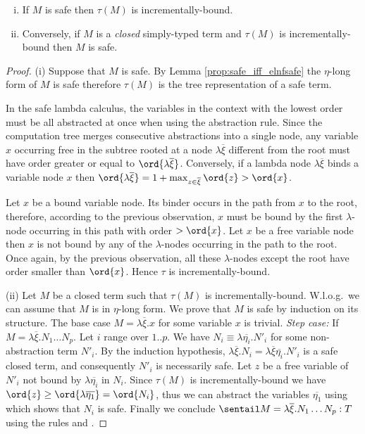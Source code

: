 \begin{proposition} \hfill
\label{prop:safe_imp_incrbound}
\begin{enumerate}[(i)]
\item If $M$ is safe then $\tau(M)$ is incrementally-bound.
\item Conversely, if $M$ is a \emph{closed} simply-typed term and $\tau(M)$
is incrementally-bound then $M$ is safe.
\end{enumerate}
\end{proposition}
\begin{proof}
  (i) Suppose that $M$ is safe. By Lemma
  \ref{prop:safe_iff_elnfsafe} the $\eta$-long form of $M$ is safe
  therefore $\tau(M)$ is the tree representation of a safe term.

In the safe lambda calculus, the variables in the context with the
lowest order must be all abstracted at once when using the
abstraction rule. Since the computation tree merges consecutive
abstractions into a single node, any variable $x$ occurring free in
the subtree rooted at a node $\lambda \overline{\xi}$ different from
the root must have order greater or equal to $\ord{\lambda
  \overline{\xi}}$. Conversely, if a lambda node $\lambda
\overline{\xi}$ binds a variable node $x$ then $\ord{\lambda
  \overline{\xi}} = 1+\max_{z\in\overline{\xi}} \ord{z} > \ord{x}$.

Let $x$ be a bound variable node. Its binder occurs in the path from
$x$ to the root, therefore, according to the previous observation,
$x$ must be bound by the first $\lambda$-node occurring in this path
with order $>\ord{x}$. Let $x$ be a free variable node then $x$ is
not bound by any of the $\lambda$-nodes occurring in the path to the
root. Once again, by the previous observation, all these
$\lambda$-nodes except the root have order smaller than $\ord{x}$.
Hence $\tau$ is incrementally-bound.

(ii) Let $M$ be a closed term such that $\tau(M)$ is
incrementally-bound.  W.l.o.g.~we can assume that $M$ is in $\eta$-long
form.  We prove that $M$ is safe by induction on its structure. The
base case $M = \lambda \overline{\xi} . x$ for some variable $x$ is
trivial.  \emph{Step case:} If $M = \lambda \overline{\xi} . N_1
\ldots N_p$.  Let $i$ range over $1..p$. We have $N_i \equiv \lambda
\overline{\eta_i} . N'_i$ for some non-abstraction term $N'_i$. By
the induction hypothesis, $\lambda \overline{\xi} . N_i = \lambda
\overline{\xi} \overline{\eta_i} . N'_i$ is a safe closed term, and
consequently $N'_i$ is necessarily safe. Let $z$ be a free variable
of $N'_i$ not bound by $\lambda \overline{\eta_i}$ in $N_i$. Since
$\tau(M)$ is incrementally-bound we have $\ord{z} \geq \ord{\lambda
  \overline{\eta_1}} = \ord{N_i}$, thus we can abstract the variables $\overline{\eta_1}$ using  which shows that $N_i$ is safe.  Finally
we conclude $\sentail M = \lambda \overline{\xi} . N_1 \ldots N_p :
T$ using the rules  and .
\end{proof}


